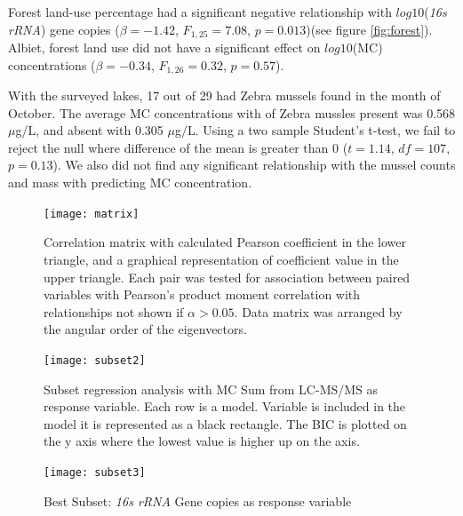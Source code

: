 Forest land-use percentage had a significant negative relationship with $log10$(\emph{16s rRNA}) gene copies ($\beta=-1.42$, $F_{{1,25}}=7.08$, $p=0.013$)(see figure \ref{fig:forest}). Albiet, forest land use did not have a significant effect on $log10$(MC) concentrations ($\beta=-0.34$, $F_{{1,26}}=0.32$, $p=0.57$).

With the surveyed lakes, 17 out of 29 had Zebra mussels found in the month of October. The average MC concentrations with  of Zebra mussles present was 0.568 $\mu$g/L, and absent with 0.305 $\mu$g/L. Using a two sample Student's t-test, we fail to reject the null where difference of the mean is greater than 0 ($t=1.14$, $df=107$, $p=0.13$). We also did not find any significant relationship with the mussel counts and mass with predicting MC concentration.



\begin{figure}
	\texttt{[image: matrix]}
	\vspace*{-15mm}
	\caption{
  Correlation matrix with calculated Pearson coefficient in the lower triangle, and a graphical representation of coefficient value in the upper triangle. Each pair was tested for association between paired variables with Pearson's product moment correlation with relationships not shown if $\alpha>0.05$. Data matrix was arranged by the angular order of the eigenvectors.}
	\label{matrix}
\end{figure}


\begin{figure}[!ht]
	\texttt{[image: subset2]}
  	\vspace*{-15mm}
	\caption{Subset regression analysis with MC Sum from LC-MS/MS as response variable. Each row is a model. Variable is included in the model it is represented as a black rectangle. The BIC is plotted on the y axis where the lowest value is higher up on the axis.}
	\label{fig:subset}
\end{figure}

\begin{figure}[!ht]
  \texttt{[image: subset3]}
  \caption{Best Subset: \emph{16s rRNA} Gene copies as response variable}
  \label{fig:subset2}
\end{figure}

